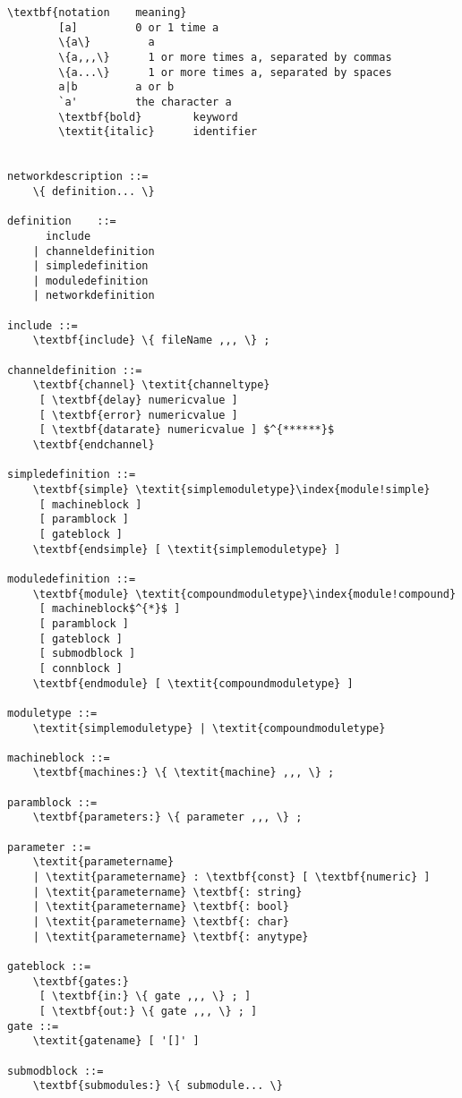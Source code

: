 \begin{Verbatim}[commandchars=\\\{\}]
        \textbf{notation    meaning}
        [a]         0 or 1 time a
        \{a\}         a
        \{a,,,\}      1 or more times a, separated by commas
        \{a...\}      1 or more times a, separated by spaces
        a|b         a or b
        `a'         the character a
        \textbf{bold}        keyword
        \textit{italic}      identifier


networkdescription ::=
    \{ definition... \}

definition    ::=
      include
    | channeldefinition
    | simpledefinition
    | moduledefinition
    | networkdefinition

include ::=
    \textbf{include} \{ fileName ,,, \} ;

channeldefinition ::=
    \textbf{channel} \textit{channeltype}
     [ \textbf{delay} numericvalue ]
     [ \textbf{error} numericvalue ]
     [ \textbf{datarate} numericvalue ] $^{******}$
    \textbf{endchannel}

simpledefinition ::=
    \textbf{simple} \textit{simplemoduletype}\index{module!simple}
     [ machineblock ]
     [ paramblock ]
     [ gateblock ]
    \textbf{endsimple} [ \textit{simplemoduletype} ]

moduledefinition ::=
    \textbf{module} \textit{compoundmoduletype}\index{module!compound}
     [ machineblock$^{*}$ ]
     [ paramblock ]
     [ gateblock ]
     [ submodblock ]
     [ connblock ]
    \textbf{endmodule} [ \textit{compoundmoduletype} ]

moduletype ::=
    \textit{simplemoduletype} | \textit{compoundmoduletype}

machineblock ::=
    \textbf{machines:} \{ \textit{machine} ,,, \} ;

paramblock ::=
    \textbf{parameters:} \{ parameter ,,, \} ;

parameter ::=
    \textit{parametername}
    | \textit{parametername} : \textbf{const} [ \textbf{numeric} ]
    | \textit{parametername} \textbf{: string}
    | \textit{parametername} \textbf{: bool}
    | \textit{parametername} \textbf{: char}
    | \textit{parametername} \textbf{: anytype}

gateblock ::=
    \textbf{gates:}
     [ \textbf{in:} \{ gate ,,, \} ; ]
     [ \textbf{out:} \{ gate ,,, \} ; ]
gate ::=
    \textit{gatename} [ '[]' ]

submodblock ::=
    \textbf{submodules:} \{ submodule... \}


\end{Verbatim}
